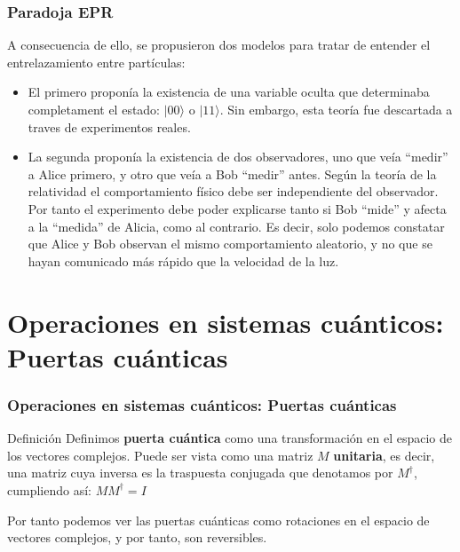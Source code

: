 \documentclass{beamer}
\newcommand{\base}[1]{|#1\rangle}
\newcommand{\transpose}[1]{#1 ^\dag}
\begin{document}
\begin{frame}
	\frametitle{Paradoja EPR}
	A consecuencia de ello, se propusieron dos modelos para tratar de entender el entrelazamiento entre partículas:
	\begin{itemize}
	\item El primero proponía la existencia de una variable oculta que determinaba completament	el estado: $\base {00}$ o $\base {11}$. Sin embargo, esta teoría fue descartada a traves de 		experimentos reales.
	\item La segunda proponía la existencia de dos observadores, uno que veía ``medir'' a Alice primero, y otro que veía a Bob ``medir'' antes. 
	Según la teoría de la relatividad el comportamiento físico debe ser independiente del observador. Por tanto el experimento debe 	poder explicarse tanto si Bob ``mide'' y afecta a la 				``medida'' de Alicia, como al contrario. Es decir, solo podemos constatar que Alice y Bob observan el mismo comportamiento aleatorio, y no que se hayan comunicado más rápido que la velocidad de la luz.
	
	\end{itemize}
\end{frame}

\section{Operaciones en sistemas cuánticos: Puertas cuánticas}

\begin{frame}
	\frametitle{Operaciones en sistemas cuánticos: Puertas cuánticas}
	\begin{block}{Definición}
	Definimos \textbf{puerta cuántica} como una transformación en el espacio de los vectores complejos. Puede ser vista como una matriz $M$ \textbf{unitaria}, es decir, una matriz 		  	
	cuya inversa es la traspuesta conjugada que denotamos por $\transpose M$, cumpliendo así: $M \transpose M = I$ 
	\end{block}
	Por tanto podemos ver las puertas cuánticas como rotaciones en el espacio de vectores complejos, y por tanto, son reversibles.
\end{frame}
\end{document}
